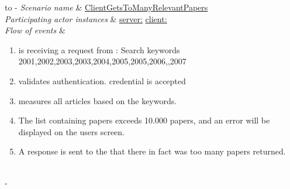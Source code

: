 %
%
\begin{table}[h!]
	\tabulinesep=1.5mm
	\begin{tabu} to 
		\tabucline[1.5pt]-
		\textit{Scenario name} & \underline{ClientGetsToManyRelevantPapers} \\
		\hline
		\textit{Participating actor \newline instances} & \underline{server:\serverside}
		\newline \underline{client:\clientside} \\
		\hline
		\textit{Flow of events} &
		\vspace{-3mm}
		\begin{enumerate}[leftmargin=*,topsep=0pt,itemsep=-1ex]
			\item \serverside is receiving a request from \clientside: Search keywords {2001,2002,2003,2003,2004,2005,2005,2006,,2007}
						
			\item \serverside validates \user authentication. \user credential is accepted
			
			\item \serverside measures all articles based on the keywords.
			
			\item The list containing papers exceeds 10.000 papers, and an error will be displayed on the users screen.
			
			\item A response is sent to the \clientside that there in fact was too many papers returned.\\				
		\end{enumerate} \\
		\tabucline[1.5pt]-
	\end{tabu}
	\caption{Scenario when a user has requested to many papers during one request.}
	\label{sc:ClientGetsToManyRelevantPapers}
\end{table}


